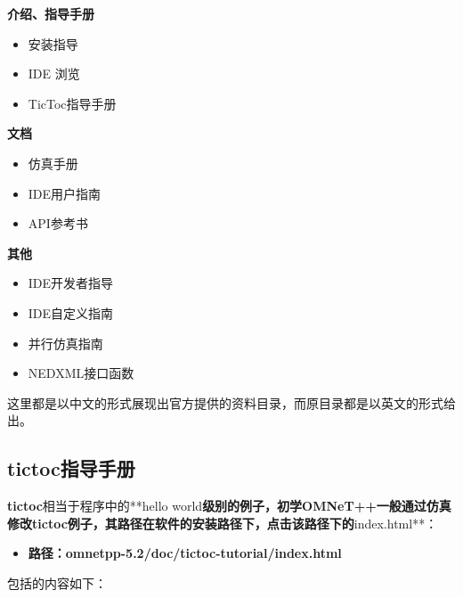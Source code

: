 \textbf{介绍、指导手册}

\begin{itemize}
\item 安装指导

\item IDE 浏览

\item TicToc指导手册

\end{itemize}

\textbf{文档}

\begin{itemize}
\item 仿真手册

\item IDE用户指南

\item API参考书

\end{itemize}

\textbf{其他}

\begin{itemize}
\item IDE开发者指导

\item IDE自定义指南

\item 并行仿真指南

\item NEDXML接口函数

\end{itemize}

这里都是以中文的形式展现出官方提供的资料目录，而原目录都是以英文的形式给出。

\subsection{tictoc指导手册}
\label{tictoc指导手册}

\textbf{tictoc}相当于程序中的**hello world\textbf{级别的例子，初学OMNeT++一般通过仿真修改\textbf{tictoc}例子，其路径在软件的安装路径下，点击该路径下的}index.html**：

\begin{itemize}
\item \textbf{路径：omnetpp-5.2\slash doc\slash tictoc-tutorial\slash index.html}

\end{itemize}

包括的内容如下：

